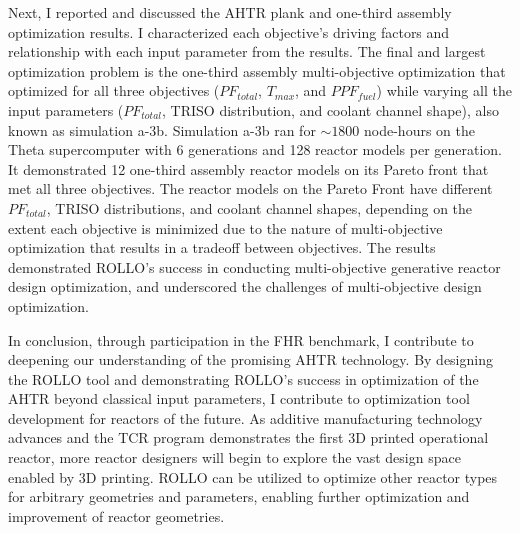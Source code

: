 Next, I reported and discussed the \gls{AHTR} plank and one-third assembly optimization 
results.  
I characterized each objective's driving factors and relationship with each input 
parameter from the results. 
The final and largest optimization problem is the one-third assembly multi-objective 
optimization that optimized for all three objectives ($PF_{total}$, $T_{max}$, and 
$PPF_{fuel}$) while varying all the input parameters ($PF_{total}$, TRISO distribution, 
and coolant channel shape), also known as simulation a-3b. 
Simulation a-3b ran for $\sim 1800$ node-hours on the Theta supercomputer with 
6 generations and 128 reactor models per generation. 
It demonstrated 12 one-third assembly reactor models on its Pareto front that met all 
three objectives. 
The reactor models on the Pareto Front have different $PF_{total}$, TRISO distributions, 
and coolant channel shapes, depending on the extent each objective is minimized due 
to the nature of multi-objective optimization that results in a tradeoff between 
objectives. 
The results demonstrated \gls{ROLLO}'s success in conducting multi-objective generative 
reactor design optimization, and underscored the challenges of multi-objective 
design optimization. 

In conclusion, through participation in the \gls{FHR} benchmark, I contribute to 
deepening our understanding of the promising \gls{AHTR} technology. 
By designing the \gls{ROLLO} tool and demonstrating \gls{ROLLO}'s success in 
optimization of the \gls{AHTR} beyond classical input parameters, I contribute to 
optimization tool development for reactors of the future. 
As additive manufacturing technology advances and the \gls{TCR} program 
demonstrates the first 3D printed operational reactor, more reactor designers 
will begin to explore the vast design space enabled by 3D printing. 
\gls{ROLLO} can be utilized to optimize other reactor types for arbitrary
geometries and parameters, enabling further optimization and improvement of reactor 
geometries.